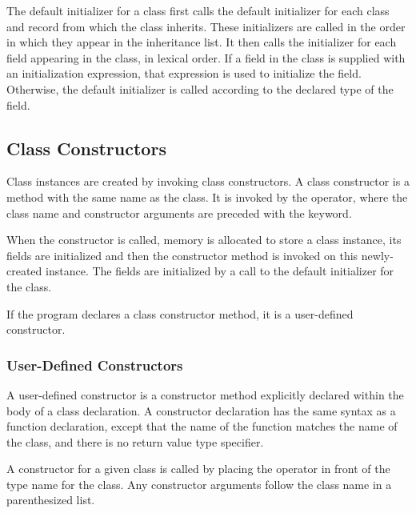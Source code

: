 The default initializer for a class first calls the default initializer for each class and record from which the
class inherits.  These initializers are called in the order in which they appear
in the inheritance list.  It then calls the initializer for each field appearing in the class, in
lexical order.
If a field in the class is supplied with an initialization expression, that
expression is used to initialize the field.  Otherwise, the default initializer
is called according to the declared type of the field.

\subsection{Class Constructors}
\label{Class_Constructors}

Class instances are created by invoking class constructors.
A class constructor is a method with the same name as the class.
It is invoked by the  operator, where the
class name and constructor arguments are preceded with the
 keyword.

When the constructor is called, memory is allocated to store
a class instance, its fields are initialized and
then the constructor method is invoked on this newly-created
instance.  The fields are initialized by a call to the default initializer for
the class.

If the program declares a class constructor method,
it is a user-defined constructor.  


\subsubsection{User-Defined Constructors}
\label{User_Defined_Constructors}

A user-defined constructor is a constructor method explicitly declared
within the body of a class declaration.  A constructor declaration has the same
syntax as a function declaration, except that the name of the function matches
the name of the class, and there is no return value type specifier.

A constructor for a given class is called by placing the  operator in front of the type
name for the class.  Any constructor arguments follow the class name in a
parenthesized list.

